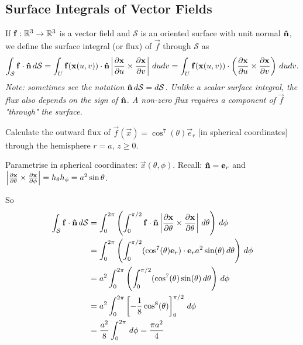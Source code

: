 \documentclass[10pt, a4paper]{article}
\begin{document}
\subsection{Surface Integrals of Vector Fields}

If $\vec{f} : \R ^ 3 \to \R ^ 3$ is a vector field and $\mathcal{S}$ is an oriented surface with unit normal $\hvec{n}$,
we define the surface integral
(or flux)
of $\vec{f}$ through $\mathcal{S}$ as
\[
\int_{\mathcal{S}}\vec{f}\cdot\hvec{n}\,d\mathcal{S} = \int_{U}\vec{f}(\vec{x}(u, v))\cdot\hvec{n}\left|\pd[\vec{x}]{u} \times \pd[\vec{x}]{v}\right|\,dudv = \int_{U}\vec{f}(\vec{x}(u, v))\cdot\left(\pd[\vec{x}]{u} \times \pd[\vec{x}]{v}\right)\,dudv.
\]
\textit{Note:
sometimes see the notation $\hvec{n}\,d\mathcal{S} = d\vec{\mathcal{S}}$.
Unlike a scalar surface integral,
the flux also depends on the sign of $\hvec{n}$.
A non-zero flux requires a component of $\vec{f}$
"through"
the surface.}

\begin{example}
    Calculate the outward flux of $\vec{f}(\vec{x}) = \cos ^ 7(\theta)\vec{e}_r$
    [in spherical coordinates]
    through the hemisphere $r = a$,
    $z \geq 0$.

    \begin{solution}
        Parametrise in spherical coordinates:
        $\vec{x}(\theta, \phi)$.
        Recall:
        $\hvec{n} = \vec{e}_r$ and $\left|\pd[\vec{x}]{\theta} \times \pd[\vec{x}]{\phi}\right| = h_{\theta}h_{\phi} = a ^ 2\sin{\theta}$.

        So
        \begin{align*}
            \int_{\mathcal{S}}\vec{f}\cdot\hvec{n}\,d\mathcal{S} &= \int_{0}^{2\pi}\left(\int_{0}^{\pi / 2}\vec{f}\cdot\hvec{n}\left|\pd[\vec{x}]{\theta}\times\pd[\vec{x}]{\theta}\right|\,d\theta\right)\,d\phi \\
            &= \int_{0}^{2\pi}\left(\int_{0}^{\pi / 2}(\cos ^ 7(\theta)\vec{e}_r)\cdot\vec{e}_r a ^ 2\sin(\theta)\,d\theta\right)\,d\phi \\
            &= a ^ 2\int_{0}^{2\pi}\left(\int_{0}^{\pi / 2}(\cos ^ 7(\theta)\sin(\theta)\,d\theta\right)\,d\phi \\
            &= a ^ 2\int_{0}^{2\pi}\left[-\frac{1}{8}\cos ^ 8(\theta)\right]_{0}^{\pi / 2}\,d\phi \\
            &= \frac{a ^ 2}{8}\int_{0}^{2\pi}\,d\phi = \frac{\pi a ^ 2}{4}
        \end{align*}
    \end{solution}
\end{example}
\end{document}
